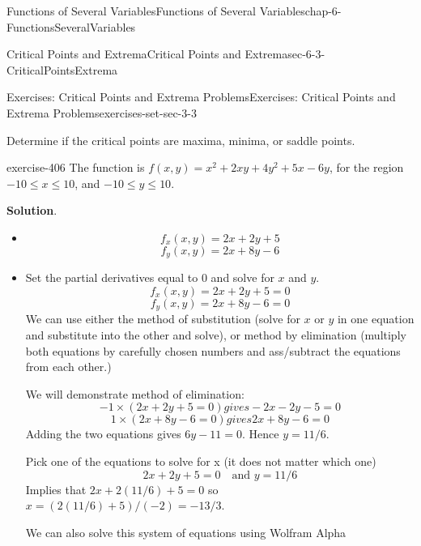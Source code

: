 \documentclass[oneside,10pt,]{book}
\numberwithin{equation}{section}
\begin{document}
\begin{chapterptx}{Functions of Several Variables}{}{Functions of Several Variables}{}{}{chap-6-FunctionsSeveralVariables}
\begin{sectionptx}{Critical Points and Extrema}{}{Critical Points and Extrema}{}{}{sec-6-3-CriticalPointsExtrema}
\begin{exercises-subsection-numberless}{Exercises: Critical Points and Extrema Problems}{}{Exercises: Critical Points and Extrema Problems}{}{}{exercises-set-sec-3-3}
\begin{itemize}[label=\textbullet]
Determine if the critical points are maxima, minima, or saddle points.%
\end{itemize}
\begin{divisionexercise}{1}{}{}{exercise-406}%
\hypertarget{p-2385}{}%
The function is \(f(x,y)=x^2+2xy+4y^2+5x-6y\), for the region \(-10\le x\le 10\), and \(-10\le y\le 10\).%
\par\smallskip%
\noindent\textbf{Solution}.\hypertarget{solution-205}{}\quad%
\leavevmode%
\begin{itemize}[label=\textbullet]
\item{}%
\begin{equation*}
f_x  (x,y)=2x+2y+5
\end{equation*}
%
\begin{equation*}
f_y  (x,y)=2x+8y-6
\end{equation*}
%
\item{}\hypertarget{p-2386}{}%
Set the partial derivatives equal to 0 and solve for \(x\) and \(y\).%
%
\begin{equation*}
f_x  (x,y)=2x+2y+5=0
\end{equation*}
%
\begin{equation*}
f_y  (x,y)=2x+8y-6=0
\end{equation*}
\hypertarget{p-2387}{}%
We can use either the method of substitution (solve for \(x\) or \(y\) in one equation and substitute into the other and solve), or method by elimination (multiply both equations by carefully chosen numbers and ass\slash{}subtract the equations from each other.)%
\par
\hypertarget{p-2388}{}%
We will demonstrate method of elimination:%
%
\begin{equation*}
-1×(2x+2y+5=0)           gives-2x-2y-5=0
\end{equation*}
%
\begin{equation*}
1×(2x+8y-6=0)          gives  2x+8y-6=0
\end{equation*}
\hypertarget{p-2389}{}%
Adding the two equations gives \(6y-11=0\). Hence  \(y=  11/6\).%
\par
\hypertarget{p-2390}{}%
Pick one of the equations to solve for x (it does not matter which one)%
%
\begin{equation*}
2x+2y+5=0  \quad \text{and }y=  11/6
\end{equation*}
\hypertarget{p-2391}{}%
Implies that   \(2x+2(11/6)+5=0\)  so \(x=  (2(11/6)+5)/(-2)=-13/3\).%
\par
\hypertarget{p-2392}{}%
We can also solve this system of equations using Wolfram Alpha%

\end{itemize}
\end{divisionexercise}
\end{exercises-subsection-numberless}
\end{sectionptx}
\end{chapterptx}
\end{document}
